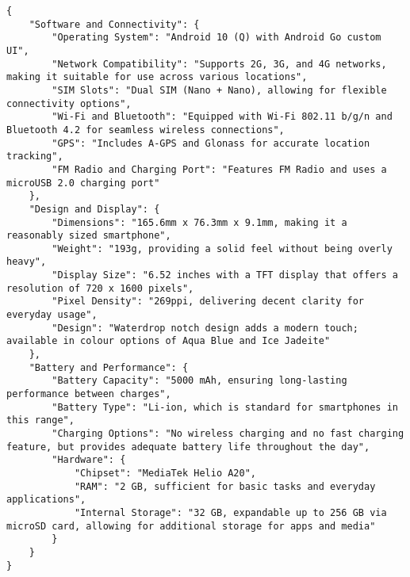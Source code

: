 \begin{figure*}
\begin{lstlisting}[style=reviews, frame = single, caption=Output generated with GPT-4o-mini., label=code:JSON-GPT4]
{
    "Software and Connectivity": {
        "Operating System": "Android 10 (Q) with Android Go custom UI",
        "Network Compatibility": "Supports 2G, 3G, and 4G networks, making it suitable for use across various locations",
        "SIM Slots": "Dual SIM (Nano + Nano), allowing for flexible connectivity options",
        "Wi-Fi and Bluetooth": "Equipped with Wi-Fi 802.11 b/g/n and Bluetooth 4.2 for seamless wireless connections",
        "GPS": "Includes A-GPS and Glonass for accurate location tracking",
        "FM Radio and Charging Port": "Features FM Radio and uses a microUSB 2.0 charging port"
    },
    "Design and Display": {
        "Dimensions": "165.6mm x 76.3mm x 9.1mm, making it a reasonably sized smartphone",
        "Weight": "193g, providing a solid feel without being overly heavy",
        "Display Size": "6.52 inches with a TFT display that offers a resolution of 720 x 1600 pixels",
        "Pixel Density": "269ppi, delivering decent clarity for everyday usage",
        "Design": "Waterdrop notch design adds a modern touch; available in colour options of Aqua Blue and Ice Jadeite"
    },
    "Battery and Performance": {
        "Battery Capacity": "5000 mAh, ensuring long-lasting performance between charges",
        "Battery Type": "Li-ion, which is standard for smartphones in this range",
        "Charging Options": "No wireless charging and no fast charging feature, but provides adequate battery life throughout the day",
        "Hardware": {
            "Chipset": "MediaTek Helio A20",
            "RAM": "2 GB, sufficient for basic tasks and everyday applications",
            "Internal Storage": "32 GB, expandable up to 256 GB via microSD card, allowing for additional storage for apps and media"
        }
    }
}
\end{lstlisting}
\end{figure*}

